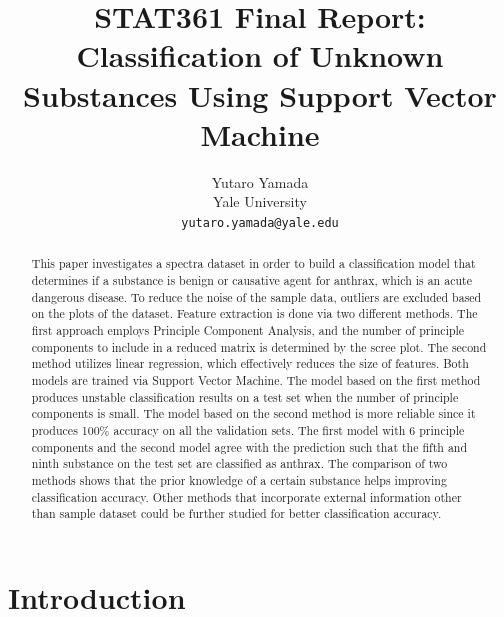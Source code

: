 \documentclass[12pt,onecolumn,letterpaper]{article}
\begin{document}
\title{STAT361 Final Report: Classification of Unknown Substances Using Support Vector Machine}

\author{Yutaro Yamada\\
Yale University\\
{\tt\small yutaro.yamada@yale.edu}
}


\maketitle

\begin{abstract}

This paper investigates a spectra dataset in order to build a classification model that determines if a substance is benign or causative agent for anthrax, which is an acute dangerous disease. To reduce the noise of the sample data, outliers are excluded based on the plots of the dataset. Feature extraction is done via two different methods. The first approach employs Principle Component Analysis, and the number of principle components to include in a reduced matrix is determined by the scree plot. The second method utilizes linear regression, which effectively reduces the size of features. Both models are trained via Support Vector Machine. The model based on the first method produces unstable classification results on a test set when the number of principle components is small. The model based on the second method is more reliable since it produces 100\% accuracy on all the validation sets. The first model with 6 principle components and the second model agree with the prediction such that the fifth and ninth substance on the test set are classified as anthrax. The comparison of two methods shows that the prior knowledge of a certain substance helps improving classification accuracy. Other methods that incorporate external information other than sample dataset could be further studied for better classification accuracy. 

\end{abstract}



\section{Introduction}
\end{document}
